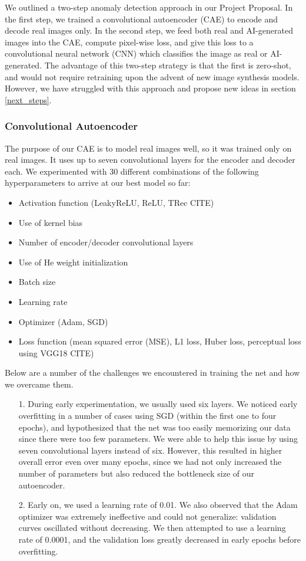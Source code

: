 \documentclass{article} %
\begin{document}
We outlined a two-step anomaly detection approach in our Project Proposal. In the first step, we trained a convolutional autoencoder (CAE) to encode and decode real images only. In the second step, we feed both real and AI-generated images into the CAE, compute pixel-wise loss, and give this loss to a convolutional neural network (CNN) which classifies the image as real or AI-generated. The advantage of this two-step strategy is that the first is zero-shot, and would not require retraining upon the advent of new image synthesis models. However, we have struggled with this approach and propose new ideas in section \ref{next_steps}.

\subsubsection{Convolutional Autoencoder}

The purpose of our CAE is to model real images well, so it was trained only on real images. It uses up to seven convolutional layers for the encoder and decoder each. We experimented with 30 different combinations of the following hyperparameters to arrive at our best model so far:

\begin{itemize}
    \item Activation function (LeakyReLU, ReLU, TRec CITE)
    \item Use of kernel bias
    \item Number of encoder/decoder convolutional layers
    \item Use of He weight initialization
    \item Batch size
    \item Learning rate
    \item Optimizer (Adam, SGD)
    \item Loss function (mean squared error (MSE), L1 loss, Huber loss, perceptual loss using VGG18 CITE)
\end{itemize}

Below are a number of the challenges we encountered in training the net and how we overcame them.

\begin{itemize}
    \item[1.] During early experimentation, we usually used six layers. We noticed early overfitting in a number of cases using SGD (within the first one to four epochs), and hypothesized that the net was too easily memorizing our data since there were too few parameters. We were able to help this issue by using seven convolutional layers instead of six. However, this resulted in higher overall error even over many epochs, since we had not only increased the number of parameters but also reduced the bottleneck size of our autoencoder.
    \item[2.] Early on, we used a learning rate of 0.01. We also observed that the Adam optimizer was extremely ineffective and could not generalize: validation curves oscillated without decreasing. We then attempted to use a learning rate of 0.0001, and the validation loss greatly decreased in early epochs before overfitting.
\end{itemize}
\end{document}
